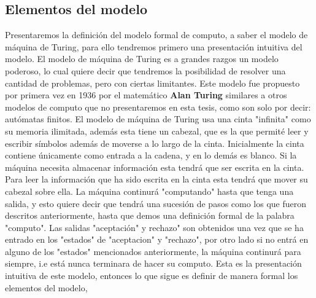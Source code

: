 \documentclass[10pt]{report}
\begin{document}
    \subsection{Elementos del modelo}\label{subsec:elementos-del-modelo-de-máquina-de-turing}
    Presentaremos la definición del modelo formal de computo, a saber el modelo de máquina de Turing,
    para ello tendremos primero una presentación intuitiva del modelo.\newline
    El modelo de máquina de Turing es a grandes razgos un modelo poderoso, lo cual quiere decir que tendremos la posibilidad
    de resolver una cantidad de problemas, pero con ciertas limitantes.\newline
    \space
    Este modelo fue propuesto por primera vez en 1936 por el matemático \textbf{Alan Turing} similares a
    otros modelos de computo que no presentaremos en esta tesis, como son solo por decir: autómatas finitos.
    El modelo de máquina de Turing usa una cinta "infinita" como su memoria ilimitada,
    además esta tiene un cabezal, que es la que permité leer y escribir símbolos además de moverse
    a lo largo de la cinta.\space
    Inicialmente la cinta contiene únicamente como entrada a la cadena, y en lo demás es blanco.\space
    Si la máquina necesita almacenar información esta tendrá que ser escrita en la cinta.\space
    Para leer la información que ha sido escrita en la cinta esta tendrá que mover su cabezal sobre ella.\space
    La máquina continurá "computando" hasta que tenga una salida, y esto quiere decir que tendrá una sucesión de pasos
    como los que fueron descritos anteriormente, hasta que demos una definición formal de la palabra "computo".
    Las salidas "aceptación" y rechazo" son obtenidos una vez que se ha entrado en los "estados" de "aceptacion" y  "rechazo",
    por otro lado si no entrá en alguno de los "estados" mencionados anteriormente, la máquina continurá para siempre, i.e
    está nunca terminara de hacer su computo.\space
    Esta es la presentación intuitiva de este modelo, entonces lo que sigue es definir de manera formal los elementos del modelo,
\end{document}
